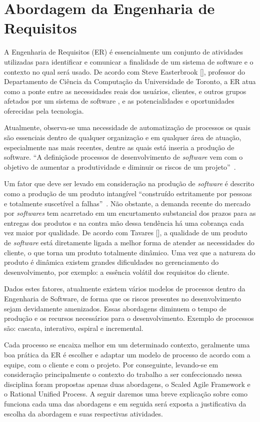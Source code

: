 \chapter[Abordagem da Engenharia de Requisitos]{Abordagem da Engenharia de Requisitos}
A Engenharia de Requisitos (ER) é essencialmente um conjunto de atividades utilizadas para identificar e comunicar a finalidade de um sistema de software e o contexto no qual será usado. De acordo com Steve Easterbrook [\citeyear{easterbrook}], professor do Departamento de Ciência da Computação da Universidade de Toronto, a ER atua como a ponte entre as necessidades reais dos usuários, clientes, e outros grupos afetados por um sistema de software , e as potencialidades e oportunidades oferecidas pela tecnologia. 

Atualmente, observa-se uma necessidade de automatização de processos os quais são essenciais dentro de qualquer organização e em qualquer área de atuação, especialmente nas mais recentes, dentre as quais está inseria a produção de software. “A definiçãode processos de desenvolvimento de \textit{software} vem com o objetivo de aumentar a produtividade e diminuir os riscos de um projeto”~\cite{vieira}.

Um fator que deve ser levado em consideração na produção de \textit{software} é descrito como a produção de um produto intangível “construído estritamente por pessoas e totalmente suscetível a falhas”~\cite{tanenbaum}. Não obstante, a demanda recente do mercado por \textit{softwares} tem acarretado em um encurtamento substancial dos prazos para as entregas dos produtos e na contra mão dessa tendência há uma cobrança cada vez maior por qualidade. De acordo com Tavares [\citeyear{tavares}], a qualidade de um produto de \textit{software} está diretamente ligada a melhor forma de atender as necessidades do cliente, o que torna um produto totalmente dinâmico. Uma vez que a natureza do produto é dinâmica existem grandes dificuldades no gerenciamento do desenvolvimento, por exemplo: a essência volátil dos requisitos do cliente.

Dados estes fatores, atualmente existem vários modelos de processos dentro da Engenharia de Software, de forma que os riscos presentes no desenvolvimento sejam devidamente amenizados. Essas abordagens diminuem o tempo de produção e os recursos necessários para o desenvolvimento. Exemplo de processos são: cascata, interativo, espiral e incremental.

Cada processo se encaixa melhor em um determinado contexto, geralmente uma boa prática da ER é escolher e adaptar um modelo de processo de acordo com a equipe, com o cliente e com o projeto. Por conseguinte, levando-se em consideração principalmente o contexto do trabalho a ser confeccionado nessa disciplina foram propostas apenas duas abordagens, o Scaled Agile Framework e o Rational Unified Process. A seguir daremos uma breve explicação sobre como funciona cada uma das abordagens e em seguida será exposta a justificativa da escolha da abordagem e suas respectivas atividades.


